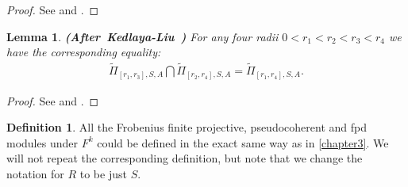 \documentclass[12pt]{amsart}
\newtheorem{lemma}[theorem]{Lemma}
\theoremstyle{definition}
\newtheorem{definition}[theorem]{Definition}
\numberwithin{equation}{section}
\begin{document}
\begin{proof}
See \cite[Lemma 5.2.10]{KL2} and \cite[Proposition 2.16]{XT2}.	
\end{proof}


\begin{lemma} \mbox{\bf{(After Kedlaya-Liu \cite[Lemma 5.2.10]{KL2})}}
For any four radii $0<r_1<r_2<r_3<r_4$ we have the corresponding equality:
\begin{align}
\widetilde{\Pi}_{[r_1,r_3],S,A}\bigcap \widetilde{\Pi}_{[r_2,r_4],S,A}	=\widetilde{\Pi}_{[r_1,r_4],S,A}.
\end{align}

\end{lemma}


\begin{proof}
See \cite[Lemma 5.2.10]{KL2} and \cite[Proposition 2.17]{XT2}.	
\end{proof}



\begin{definition}
All the Frobenius finite projective, pseudocoherent and fpd modules under $F^k$ could be defined in the exact same way as in \cref{chapter3}. We will not repeat the corresponding definition, but note that we change the notation for $R$ to be just $S$.	
\end{definition}
\end{document}
